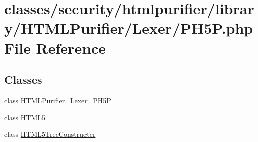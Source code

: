 \hypertarget{PH5P_8php}{\section{classes/security/htmlpurifier/library/\+H\+T\+M\+L\+Purifier/\+Lexer/\+P\+H5\+P.php File Reference}
\label{PH5P_8php}
}
\subsection*{Classes}
\begin{DoxyCompactItemize}
\item 
class \hyperlink{classHTMLPurifier__Lexer__PH5P}{H\+T\+M\+L\+Purifier\+\_\+\+Lexer\+\_\+\+P\+H5\+P}
\item 
class \hyperlink{classHTML5}{H\+T\+M\+L5}
\item 
class \hyperlink{classHTML5TreeConstructer}{H\+T\+M\+L5\+Tree\+Constructer}
\end{DoxyCompactItemize}
